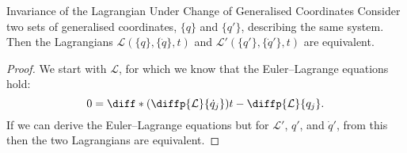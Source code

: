 \documentclass[fleqn]{NotesClass}
\newcommand*{\lagrangian}{\mathcal{L}}
\begin{document}
    \begin{thm}{Invariance of the Lagrangian Under Change of Generalised Coordinates}{}
        Consider two sets of generalised coordinates, \(\{q\}\) and \(\{q'\}\), describing the same system.
        Then the Lagrangians \(\lagrangian(\{q\}, \{\dot{q}\}, t)\) and \(\lagrangian'(\{q'\}, \{\dot{q}'\}, t)\) are equivalent.
        
        \begin{proof}
            We start with \(\lagrangian\), for which we know that the Euler--Lagrange equations hold:
            \begin{equation}
                0 = \diff*{\left( \diffp{\lagrangian}{\dot{q}_j} \right)}{t} - \diffp{\lagrangian}{q_j}.
            \end{equation}
            If we can derive the Euler--Lagrange equations but for \(\lagrangian'\), \(q'\), and \(\dot{q}'\), from this then the two Lagrangians are equivalent.
            

\end{proof}
\end{thm}
\end{document}
